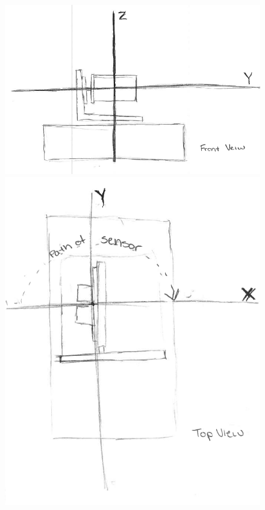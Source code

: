 \documentclass{article}
\begin{document}
\begin{figure}[h!]
\begin{center}
\includegraphics[scale=0.3]{FrontView.PNG}
\includegraphics[scale=0.3]{TopView.PNG}

\end{center}
\end{figure}
\end{document}
